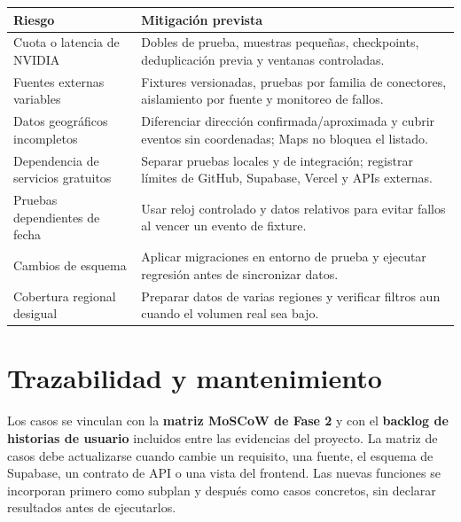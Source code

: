 \documentclass[11pt,a4paper]{article}
\begin{document}
\begin{longtable}{@{}L{4.2cm}L{10.6cm}@{}}
\toprule
\textbf{Riesgo} & \textbf{Mitigación prevista} \\
\midrule
\endhead
Cuota o latencia de NVIDIA & Dobles de prueba, muestras pequeñas, checkpoints, deduplicación previa y ventanas controladas. \\
Fuentes externas variables & Fixtures versionadas, pruebas por familia de conectores, aislamiento por fuente y monitoreo de fallos. \\
Datos geográficos incompletos & Diferenciar dirección confirmada/aproximada y cubrir eventos sin coordenadas; Maps no bloquea el listado. \\
Dependencia de servicios gratuitos & Separar pruebas locales y de integración; registrar límites de GitHub, Supabase, Vercel y APIs externas. \\
Pruebas dependientes de fecha & Usar reloj controlado y datos relativos para evitar fallos al vencer un evento de fixture. \\
Cambios de esquema & Aplicar migraciones en entorno de prueba y ejecutar regresión antes de sincronizar datos. \\
Cobertura regional desigual & Preparar datos de varias regiones y verificar filtros aun cuando el volumen real sea bajo. \\
\bottomrule
\end{longtable}

\section{Trazabilidad y mantenimiento}

Los casos se vinculan con la \textbf{matriz MoSCoW de Fase 2} y con el
\textbf{backlog de historias de usuario} incluidos entre las evidencias del proyecto.
La matriz de casos debe
actualizarse cuando cambie un requisito, una fuente, el esquema de Supabase, un contrato de
API o una vista del frontend. Las nuevas funciones se incorporan primero como subplan y
después como casos concretos, sin declarar resultados antes de ejecutarlos.
\end{document}
